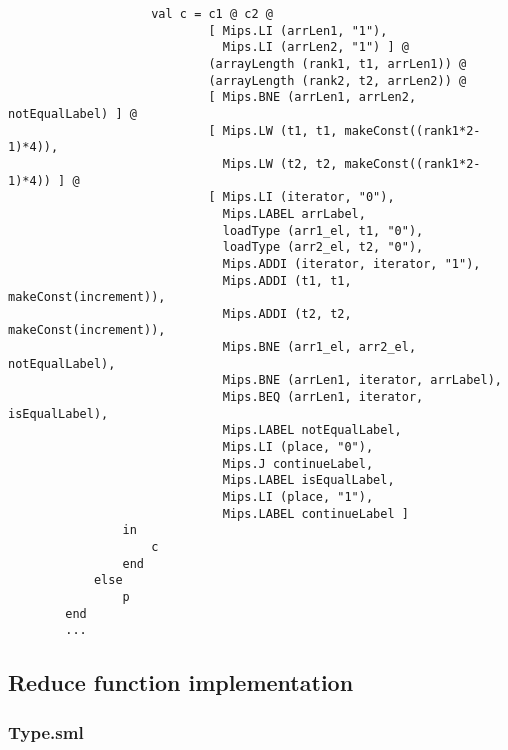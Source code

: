 \documentclass[12pt]{article}
\begin{document}
\begin{lstlisting}
                    val c = c1 @ c2 @ 
                            [ Mips.LI (arrLen1, "1"), 
                              Mips.LI (arrLen2, "1") ] @
                            (arrayLength (rank1, t1, arrLen1)) @
                            (arrayLength (rank2, t2, arrLen2)) @
                            [ Mips.BNE (arrLen1, arrLen2, notEqualLabel) ] @
                            [ Mips.LW (t1, t1, makeConst((rank1*2-1)*4)),
                              Mips.LW (t2, t2, makeConst((rank1*2-1)*4)) ] @
                            [ Mips.LI (iterator, "0"),
                              Mips.LABEL arrLabel,
                              loadType (arr1_el, t1, "0"),
                              loadType (arr2_el, t2, "0"),
                              Mips.ADDI (iterator, iterator, "1"),
                              Mips.ADDI (t1, t1, makeConst(increment)),
                              Mips.ADDI (t2, t2, makeConst(increment)),
                              Mips.BNE (arr1_el, arr2_el, notEqualLabel),
                              Mips.BNE (arrLen1, iterator, arrLabel),
                              Mips.BEQ (arrLen1, iterator, isEqualLabel),
                              Mips.LABEL notEqualLabel,
                              Mips.LI (place, "0"),
                              Mips.J continueLabel,
                              Mips.LABEL isEqualLabel,
                              Mips.LI (place, "1"),
                              Mips.LABEL continueLabel ]
                in 
                    c
                end
            else 
                p
        end
        ...
\end{lstlisting}

\pagebreak

\subsection{Reduce function implementation}

\subsubsection{Type.sml}
\end{document}
